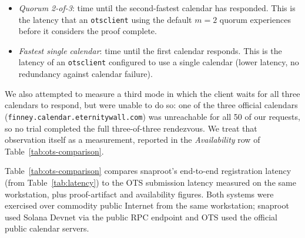 \documentclass[11pt,a4paper]{article}
\begin{document}
\begin{itemize}
\item \textit{Quorum 2-of-3}: time until the second-fastest calendar
has responded. This is the latency that an \texttt{otsclient} using
the default $m = 2$ quorum experiences before it considers the proof
complete.
\item \textit{Fastest single calendar}: time until the first calendar
responds. This is the latency of an \texttt{otsclient} configured to
use a single calendar (lower latency, no redundancy against calendar
failure).
\end{itemize}

We also attempted to measure a third mode in which the client waits
for all three calendars to respond, but were unable to do so: one of
the three official calendars
(\texttt{finney.calendar.\allowbreak eternitywall.com}) was unreachable for all 50
of our requests, so no trial completed the full three-of-three
rendezvous. We treat that observation itself as a measurement, reported
in the \textit{Availability} row of Table~\ref{tab:ots-comparison}.

Table~\ref{tab:ots-comparison} compares snaproot's end-to-end
registration latency (from Table~\ref{tab:latency}) to the OTS
submission latency measured on the same workstation, plus
proof-artifact and availability figures. Both systems were exercised
over commodity public Internet from the same workstation; snaproot
used Solana Devnet via the public RPC endpoint and OTS used the
official public calendar servers.
\end{document}
